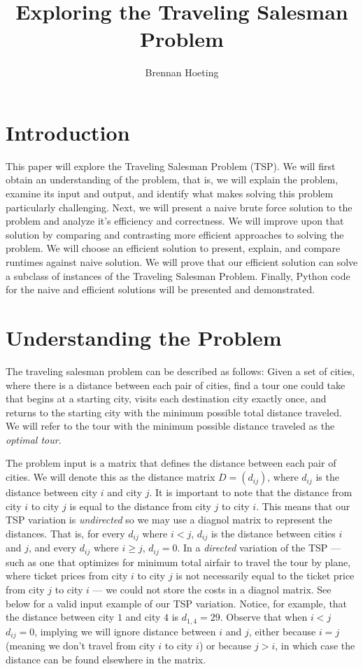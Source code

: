 \documentclass{article}
\begin{document}
\title{Exploring the Traveling Salesman Problem}
\author{Brennan Hoeting}
\date{}
\maketitle

\section*{Introduction}
This paper will explore the Traveling Salesman Problem (TSP).
We will first obtain an understanding of the problem, that
is, we will explain the problem, examine its input and output,
and identify what makes solving this problem particularly
challenging.  Next, we will present a naive brute force solution
to the problem and analyze it's efficiency and correctness.  We
will improve upon that solution by comparing and contrasting
more efficient approaches to solving the problem.  We will choose
an efficient solution to present, explain, and compare runtimes
against naive solution.  We will prove that our efficient solution
can solve a subclass of instances of the Traveling Salesman Problem.
Finally, Python code for the naive and efficient solutions will be
presented and demonstrated.

\section*{Understanding the Problem}
The traveling salesman problem can be described as follows:
Given a set of cities, where there is a distance between
each pair of cities, find a tour one could take that
begins at a starting city, visits each destination city
exactly once, and returns to the starting city with the
minimum possible total distance traveled.  We will refer
to the tour with the minimum possible distance traveled
as the \textit{optimal tour}.
\par

The problem input is a matrix that defines the distance
between each pair of cities.  We will denote this as
the distance matrix $D = (d_{ij})$, where $d_{ij}$ is
the distance between city $i$ and city $j$.  It is important
to note that the distance from city $i$ to city $j$ is equal
to the distance from city $j$ to city $i$. This means that our
TSP variation is \textit{undirected} so we may use a diagnol
matrix to represent the distances.  That is, for every $d_{ij}$
where $i<j$, $d_{ij}$ is the distance between cities $i$ and $j$,
and every $d_{ij}$ where $i\geq j$, $d_{ij} = 0$.  In a \textit{directed}
variation of the TSP --- such as one that optimizes for minimum total
airfair to travel the tour by plane, where ticket prices from city
$i$ to city $j$ is not necessarily equal to the ticket price from
city $j$ to city $i$ --- we could not store the costs in a diagnol
matrix.  See below for a valid input example of our TSP variation.
Notice, for example, that the distance between city $1$ and city $4$
is $d_{1,4}=29$.  Observe that when $i<j$ $d_{ij}=0$, implying
we will ignore distance between $i$ and $j$, either because $i=j$
(meaning we don't travel from city $i$ to city $i$) or because $j>i$,
in which case the distance can be found elsewhere in the matrix.
\par
\end{document}
